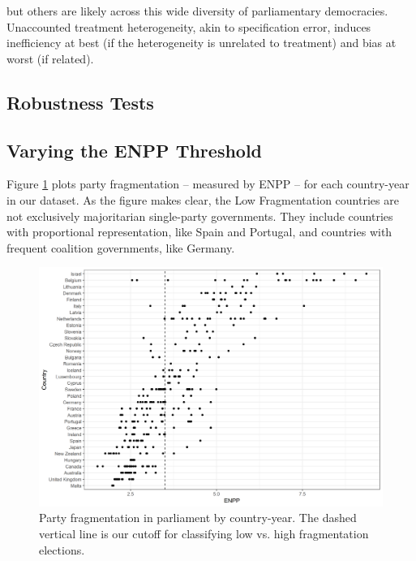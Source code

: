 \documentclass[12pt]{article}
\begin{document}
but others are likely across this wide diversity of parliamentary democracies. Unaccounted treatment heterogeneity, akin to specification error, induces inefficiency at best (if the heterogeneity is unrelated to treatment) and bias at worst (if related).




\begin{appendices}
	
	
	\section{Robustness Tests} \label{appendix:robustness}
	
	\subsection{Varying the ENPP Threshold}
    
    Figure \ref{fig:LowFragHighFrag} plots party fragmentation -- measured by ENPP -- for each country-year in our dataset. As the figure makes clear, the Low Fragmentation countries are not exclusively majoritarian single-party governments. They include countries with proportional representation, like Spain and Portugal, and countries with frequent coalition governments, like Germany.
    
    \begin{figure}[h]
		\centering
		\includegraphics[width=\linewidth]{Figures/LowFragHighFrag.png}
		\caption{Party fragmentation in parliament by country-year. The dashed vertical line is our cutoff for classifying low vs. high fragmentation elections.}
		\label{fig:LowFragHighFrag}
	\end{figure}
    

\end{appendices}
\end{document}
